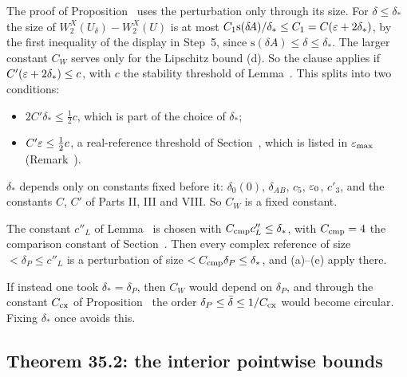 \begin{detail}
\begin{step}
The proof of Proposition~ uses the perturbation only through its size. For $\delta\le\delta_*$ the size of $W_2^X(U_\delta)-W_2^X(U)$ is at most $C_1\mathrm s(\delta\!A)/\delta_*\le C_1=C(\varepsilon+2\delta_*)$, by the first inequality of the display in Step~5, since $\mathrm s(\delta\!A)\le\delta\le\delta_*$. The larger constant $C_W$ serves only for the Lipschitz bound (d). So the clause applies if $C'(\varepsilon+2\delta_*)\le c$, with $c$ the stability threshold of Lemma~. This splits into two conditions:
\begin{itemize}
\item $2C'\delta_*\le\frac12c$, which is part of the choice of $\delta_*$;
\item $C'\varepsilon\le\frac12c$, a real-reference threshold of Section~, which is listed in $\varepsilon_{\max}$ (Remark~).
\end{itemize}
$\delta_*$ depends only on constants fixed before it: $\delta_0(0)$, $\delta_{AB}$, $c_5$, $\varepsilon_0$, $c'_3$, and the constants $C$, $C'$ of Parts II, III and VIII. So $C_W$ is a fixed constant.

The constant $c''_L$ of Lemma~ is chosen with $C_{\rm cmp}c''_L\le\delta_*$, with $C_{\rm cmp}=4$ the comparison constant of Section~. Then every complex reference of size $<\delta_P\le c''_L$ is a perturbation of size $<C_{\rm cmp}\delta_P\le\delta_*$, and (a)--(e) apply there.

If instead one took $\delta_*=\delta_P$, then $C_W$ would depend on $\delta_P$, and through the constant $C_{\rm cx}$ of Proposition~ the order $\delta_P\le\bar\delta\le1/C_{\rm cx}$ would become circular. Fixing $\delta_*$ once avoids this.
\end{step}
\end{detail}

\subsection{Theorem 35.2: the interior pointwise bounds}\label{d8:ID}


